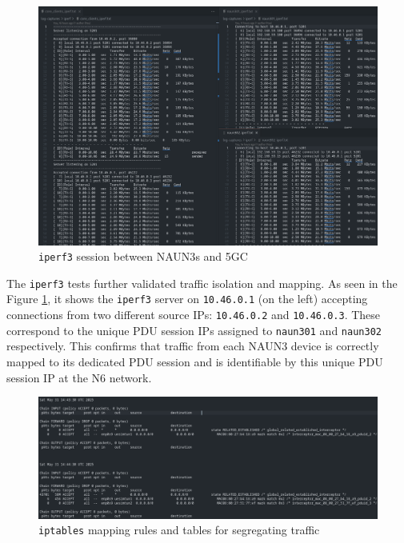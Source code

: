 \begin{figure}
    \centering
    \includegraphics[width=1\linewidth]{figs/iperf_naun3_to_core.png}
    \caption{\texttt{iperf3} session between \acs{NAUN3}s and \acs{5GC}}
    \label{fig:iperf_naun3_to_core}
\end{figure}

The \texttt{iperf3} tests further validated traffic isolation and mapping. As seen in the Figure \ref{fig:iperf_naun3_to_core}, it shows the \texttt{iperf3} server on \texttt{10.46.0.1} (on the left) accepting connections from two different source \acp{IP}: \texttt{10.46.0.2} and \texttt{10.46.0.3}. These correspond to the unique \ac{PDU} session \acp{IP} assigned to \texttt{naun301} and \texttt{naun302} respectively. This confirms that traffic from each \ac{NAUN3} device is correctly mapped to its dedicated \ac{PDU} session and is identifiable by this unique \ac{PDU} session \ac{IP} at the N6 network.

\begin{figure}
    \centering
    \includegraphics[width=1\linewidth]{figs/iptable_mapping_rules.png}
    \caption{\texttt{iptables} mapping rules and tables for segregating traffic}
    \label{fig:iptable_mapping_rules}
\end{figure}

